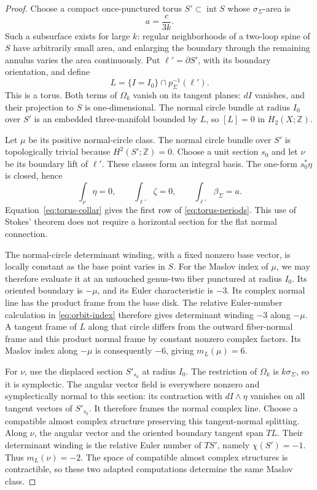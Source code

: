 \documentclass[11pt]{amsart}
\theoremstyle{definition}
\theoremstyle{remark}
\newcommand{\Z}{\mathbb Z}
\begin{document}
\begin{proof}
Choose a compact once-punctured torus $S'\subset\operatorname{int}S$
whose $\sigma_\Sigma$-area is
\[
                         a=\frac{c}{3k}.
\]
Such a subsurface exists for large $k$: regular neighborhoods of a
two-loop spine of $S$ have arbitrarily small area, and enlarging the
boundary through the remaining annulus varies the area continuously.
Put $\ell'=\partial S'$, with its boundary orientation, and define
\[
                  L=\{I=I_0\}\cap p_\Sigma^{-1}(\ell').
\]
This is a torus. Both terms of $\Omega_k$ vanish on its tangent
planes: $dI$ vanishes, and their projection to $S$ is one-dimensional.
The normal circle bundle at radius $I_0$ over $S'$ is an embedded
three-manifold bounded by $L$, so $[L]=0$ in $H_2(X;\Z)$.

Let $\mu$ be its positive normal-circle class. The normal circle
bundle over $S'$ is topologically trivial because $H^2(S';\Z)=0$.
Choose a unit section $s_0$ and let $\nu$ be its boundary lift of
$\ell'$. These classes form an integral basis. The one-form
$s_0^*\eta$ is closed, hence
\[
 \int_\nu\eta=0,\qquad
 \int_{\ell'}\zeta=0,\qquad
 \int_{\ell'}\beta_\Sigma=a.
\]
Equation~\eqref{eq:torus-collar} gives the first row of
\eqref{eq:torus-periods}. This use of Stokes' theorem does not
require a horizontal section for the flat normal connection.

The normal-circle determinant winding, with a fixed nonzero base
vector, is locally constant as the base point varies in $S$.
For the Maslov index of $\mu$, we may therefore evaluate it at
an untouched genus-two fiber punctured at radius $I_0$.
Its oriented boundary is $-\mu$, and its Euler
characteristic is $-3$. Its complex normal line has the product
frame from the base disk. The relative Euler-number calculation in
\eqref{eq:orbit-index} therefore gives determinant winding $-3$
along $-\mu$. A tangent frame of $L$ along that circle differs
from the outward fiber-normal frame and this product normal frame
by constant nonzero complex factors. Its Maslov index along $-\mu$
is consequently $-6$, giving $m_L(\mu)=6$.

For $\nu$, use the displaced section $S'_{s_0}$ at radius $I_0$.
The restriction of $\Omega_k$ is $k\sigma_\Sigma$, so it is
symplectic. The angular vector field is everywhere nonzero and
symplectically normal to this section: its contraction with
$dI\wedge\eta$ vanishes on all tangent vectors of $S'_{s_0}$.
It therefore frames the normal complex line. Choose a compatible
almost complex structure preserving this tangent-normal splitting.
Along $\nu$, the angular vector and the oriented boundary tangent
span $TL$. Their determinant winding is the relative Euler number
of $TS'$, namely $\chi(S')=-1$. Thus $m_L(\nu)=-2$.
The space of compatible almost complex structures is contractible,
so these two adapted computations determine the same Maslov class.


\end{proof}
\end{document}
